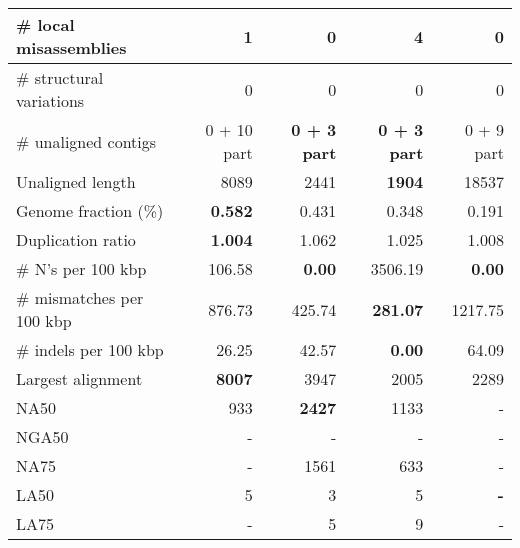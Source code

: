 \documentclass[12pt,a4paper]{article}
\begin{document}
\begin{table}[ht]
\begin{center}
\begin{tabular}{|l*{4}{|r}|}
\# local misassemblies & 1 & {\bf 0} & 4 & {\bf 0} \\ \hline
\# structural variations & 0 & 0 & 0 & 0 \\ \hline
\# unaligned contigs & 0 + 10 part & {\bf 0 + 3 part} & {\bf 0 + 3 part} & 0 + 9 part \\ \hline
Unaligned length & 8089 & 2441 & {\bf 1904} & 18537 \\ \hline
Genome fraction (\%) & {\bf 0.582} & 0.431 & 0.348 & 0.191 \\ \hline
Duplication ratio & {\bf 1.004} & 1.062 & 1.025 & 1.008 \\ \hline
\# N's per 100 kbp & 106.58 & {\bf 0.00} & 3506.19 & {\bf 0.00} \\ \hline
\# mismatches per 100 kbp & 876.73 & 425.74 & {\bf 281.07} & 1217.75 \\ \hline
\# indels per 100 kbp & 26.25 & 42.57 & {\bf 0.00} & 64.09 \\ \hline
Largest alignment & {\bf 8007} & 3947 & 2005 & 2289 \\ \hline
NA50 & 933 & {\bf 2427} & 1133 & - \\ \hline
NGA50 & - & - & - & - \\ \hline
NA75 & - & 1561 & 633 & - \\ \hline
LA50 & 5 & 3 & 5 & {\bf -} \\ \hline
LA75 & - & 5 & 9 & - \\ \hline
\end{tabular}
\end{center}
\end{table}
\end{document}

